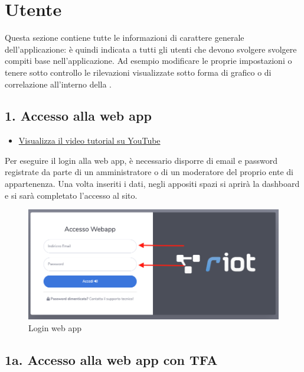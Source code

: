 \section{Utente}
Questa sezione contiene tutte le informazioni di carattere generale dell'applicazione: è quindi indicata a tutti gli utenti che devono svolgere svolgere compiti base nell'applicazione. Ad esempio modificare le proprie impostazioni o tenere sotto controllo le rilevazioni visualizzate sotto forma di grafico o di correlazione all'interno della .

\subsection{1. Accesso alla web app}

	\begin{itemize}
		\item \href{https://www.youtube.com/watch?v=PjySMOLCtMA&list=PLPKYjnuIh1FA3b3jn_bwY_ztYzaFn2mIT&index=1}{Visualizza il video tutorial su YouTube} 
	\end{itemize}
	Per eseguire il login alla web app, è necessario disporre di email e password registrate da parte di un amministratore o di un moderatore del proprio ente di appartenenza. Una volta inseriti i dati, negli appositi spazi si aprirà la dashboard e si sarà completato l'accesso al sito.

	\begin{figure}[H]
		\centering
		\includegraphics[scale=0.450]{res/images/membro/login.png}
		\caption{Login web app}
	\end{figure}

\newpage \subsection{1a. Accesso alla web app con TFA}
	
